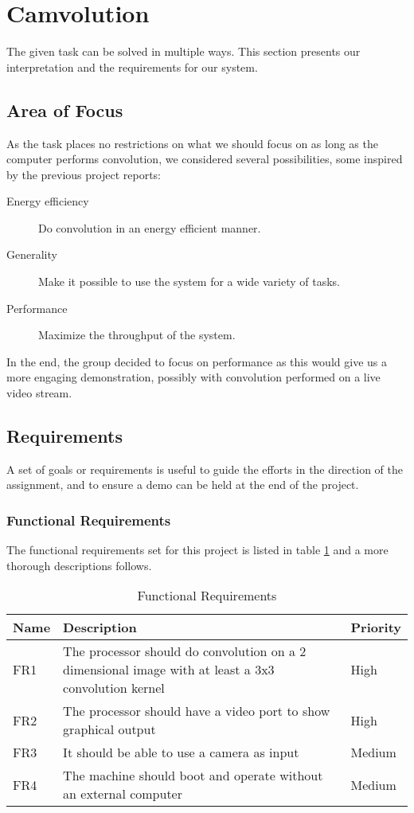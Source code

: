 \section{Camvolution}
The given task can be solved in multiple ways. This section presents our interpretation and the requirements for our system.

\subsection{Area of Focus}
As the task places no restrictions on what we should focus on as long as the computer performs convolution, we considered several possibilities, some inspired by the previous project reports:

\begin{description}
    \item[Energy efficiency] Do convolution in an energy efficient manner.
    \item[Generality] Make it possible to use the system for a wide variety of tasks.
    \item[Performance] Maximize the throughput of the system.
\end{description}

In the end, the group decided to focus on performance as this would give us a more engaging demonstration, possibly with convolution performed on a live video stream.

\subsection{Requirements}
A set of goals or requirements is useful to guide the efforts in the direction of the assignment, and to ensure a demo can be held at the end of the project.

\subsubsection{Functional Requirements}
The functional requirements set for this project is listed in table \ref{tab:functional-requirements} and a more thorough descriptions follows.

\begin{table}[h]
    \centering
    \label{tab:functional-requirements}
    \begin{tabular}{lp{12cm}l}
        Name & Description & Priority \\
        \hline
        FR1 &
            The processor should do convolution on a 2 dimensional image with at least a 3x3 convolution kernel &
            High \\
        FR2 &
            The processor should have a video port to show graphical output &
            High \\
        FR3 &
            It should be able to use a camera as input &
            Medium \\
        FR4 &
            The machine should boot and operate without an external computer &
            Medium
    \end{tabular}
    \caption{Functional Requirements}
\end{table}

